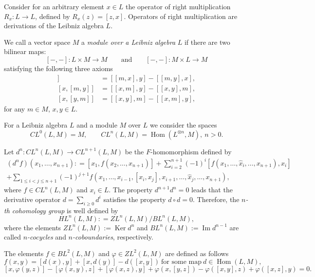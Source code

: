\documentclass[12pt,reqno]{amsart}
\numberwithin{equation}{section}
\begin{document}
Consider for an arbitrary element $x\in L$ the operator of right multiplication $R_x \colon L\to L$, defined by $R_x(z)=[z,x]$. Operators of right multiplication are derivations of the Leibniz algebra $L$.

We call a vector space $M$ a {\it module over a Leibniz algebra} $L$ if there are two bilinear maps:
\[ [-,-] \colon L\times M \rightarrow M \qquad \text{and} \qquad [-,-] \colon M\times L \rightarrow M \]
satisfying the following three axioms
\begin{align*}
[m,[x,y]] & =[[m,x],y]-[[m,y],x],\\
[x,[m,y]] & =[[x,m],y]-[[x,y],m],\\
[x,[y,m]] & =[[x,y],m]-[[x,m],y],
\end{align*}
for any $m\in M$, $x, y \in L$.

For a Leibniz algebra $L$ and a module $M$ over $L$ we consider the spaces
\[CL^0(L,M) = M, \qquad CL^n(L,M)=\operatorname{Hom}(L^{\otimes n}, M), \ n > 0.\]

Let $d^n \colon CL^n(L,M) \rightarrow CL^{n+1}(L,M)$ be the
$F$-homomorphism defined by
 \begin{multline*}
(d^nf)(x_1, \dots , x_{n+1}): = [x_1,f(x_2,\dots,x_{n+1})]
+\sum\limits_{i=2}^{n+1}(-1)^{i}[f(x_1,
\dots, \widehat{x}_i, \dots , x_{n+1}),x_i]\\
+\sum\limits_{1\leq i<j\leq {n+1}}(-1)^{j+1}f(x_1, \dots,
x_{i-1},[x_i,x_j], x_{i+1}, \dots , \widehat{x}_j, \dots
,x_{n+1}),
\end{multline*}
 where $f\in CL^n(L,M)$ and $x_i\in L$. The property $d^{n+1}d^n=0$ leads that the derivative
operator $d=\sum\limits_{i \geq 0}d^i$ satisfies the property
$d\circ d = 0$. Therefore, the \emph{$n$-th cohomology group} is well defined by
\[HL^n(L,M): = ZL^n(L,M)/ BL^n(L,M),\]
where the elements $ZL^n(L,M):= \operatorname{Ker} d^{n}$ and $BL^n(L,M):=\operatorname{Im} d^{n-1}$ are called {\it
$n$-cocycles} and {\it $n$-coboundaries}, respectively.

The elements $f\in BL^2(L,M)$ and $\varphi \in ZL^2(L,M)$ are
defined as follows
\begin{equation}\label{eqB2} f(x,y) = [d(x),y] + [x,d(y)] -
d([x,y]) \ \text{for some map} \ d\in \operatorname{Hom}(L, M), \end{equation}
\begin{equation}\label{eqZ2} [x,\varphi(y,z)]
 - [\varphi(x,y), z] + [\varphi(x,z), y] + \varphi(x, [y,z]) - \varphi([x,y],z) + \varphi([x,z],y)=0. \end{equation}
\end{document}
